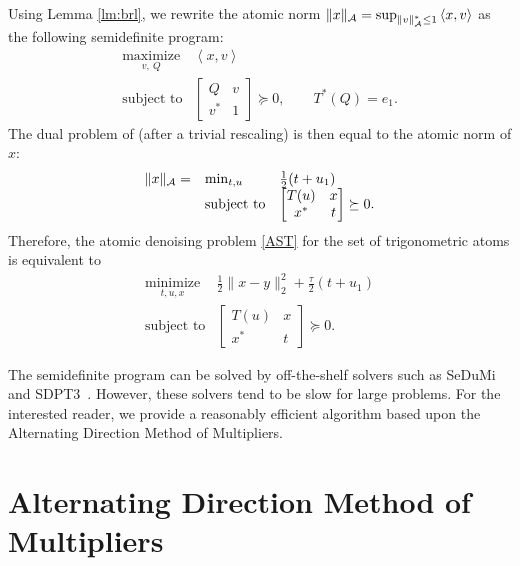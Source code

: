 Using Lemma \ref{lm:brl}, we rewrite the atomic norm $\|x\|_{\mathcal{A}} =
\sup_{\|v\|_{\mathcal{A}}^*\leq 1} \left<x, v\right> $ as the following semidefinite
program:
\begin{equation}\label{eq:sdpprimal}
 \begin{array}{ll}
\operatorname*{maximize}_{v,\ Q} & \left<x, v\right>\\
\text{subject  to}  &
 \begin{bmatrix}
  Q & v \\
  v^* & 1
 \end{bmatrix} \succeq 0, \qquad  T^*(Q) = {e}_1 .
\end{array}
\end{equation}
The dual problem of  (after a trivial rescaling) is then equal to
the atomic norm of $x$:
\begin{align*}
\begin{array}{lll} \|x\|_{\mathcal{A}} =&  \min_{t, u} & \tfrac{1}{2} (t + u_1)  \\
&\operatorname{subject\ to}
& \begin{bmatrix}
  T(u) & x \\
  x^* & t
 \end{bmatrix} \succeq 0.\end{array}
\end{align*}
Therefore, the atomic denoising problem \eqref{AST} for the set of trigonometric atoms is equivalent to
\begin{equation}\label{eq:sdpdenoising}
\begin{array}{ll}
\operatorname*{minimize}_{t, u, x} & \frac{1}{2} \|x - y\|_2^2 + \frac{\tau}{2}(t + u_1) \\
\operatorname{subject\ to}
& \begin{bmatrix}
  T(u) &  x \\
 x^* & t
 \end{bmatrix} \succeq 0.\end{array} 
\end{equation}

The semidefinite program  can be solved by off-the-shelf
solvers such as SeDuMi~\cite{sedumi} and SDPT3~\cite{SDPT3}. However, these
solvers tend to be slow for  large problems. For the interested reader, we provide a reasonably efficient algorithm based upon the Alternating Direction Method of Multipliers.

\section{Alternating Direction Method of Multipliers}
\label{sec:admm}

